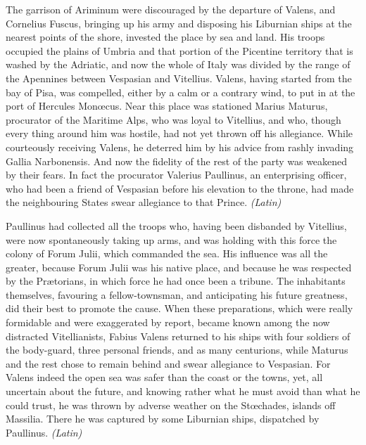 
The garrison of Ariminum were discouraged by the departure of Valens, and Cornelius Fuscus, bringing up his army and disposing his Liburnian ships at the nearest points of the shore, invested the place by sea and land. His troops occupied the plains of Umbria and that portion of the Picentine territory that is washed by the Adriatic, and now the whole of Italy was divided by the range of the Apennines between Vespasian and Vitellius. Valens, having started from the bay of Pisa, was compelled, either by a calm or a contrary wind, to put in at the port of Hercules Monœcus. Near this place was stationed Marius Maturus, procurator of the Maritime Alps, who was loyal to Vitellius, and who, though every thing around him was hostile, had not yet thrown off his allegiance. While courteously receiving Valens, he deterred him by his advice from rashly invading Gallia Narbonensis. And now the fidelity of the rest of the party was weakened by their fears. In fact the procurator Valerius Paullinus, an enterprising officer, who had been a friend of Vespasian before his elevation to the throne, had made the neighbouring States swear allegiance to that Prince. \emph{(Latin)}


Paullinus had collected all the troops who, having been disbanded by Vitellius, were now spontaneously taking up arms, and was holding with this force the colony of Forum Julii, which commanded the sea. His influence was all the greater, because Forum Julii was his native place, and because he was respected by the Prætorians, in which force he had once been a tribune. The inhabitants themselves, favouring a fellow-townsman, and anticipating his future greatness, did their best to promote the cause. When these preparations, which were really formidable and were exaggerated by report, became known among the now distracted Vitellianists, Fabius Valens returned to his ships with four soldiers of the body-guard, three personal friends, and as many centurions, while Maturus and the rest chose to remain behind and swear allegiance to Vespasian. For Valens indeed the open sea was safer than the coast or the towns, yet, all uncertain about the future, and knowing rather what he must avoid than what he could trust, he was thrown by adverse weather on the Stœchades, islands off Massilia. There he was captured by some Liburnian ships, dispatched by Paullinus. \emph{(Latin)}


